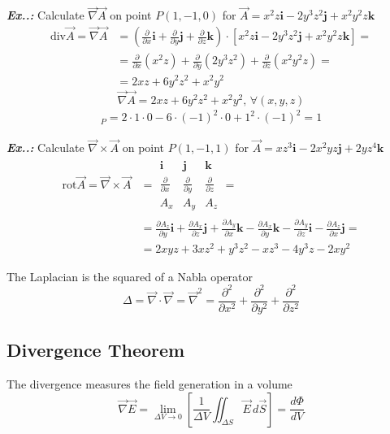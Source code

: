 \documentclass[a4paper]{article}
\begin{document}
\vspace{2ex}\textbf{\textit{Ex.\thesection.\theex: }}Calculate $\vec{\nabla}\vec{A}$ on point $P(1,-1,0)$ for $\vec{A}=x^{2}z\mathbf{i}-2y^{3}z^{2}\mathbf{j}+x^{2}y^{2}z\mathbf{k}$
\begin{align}
\text{div}\vec{A}=\vec{\nabla}\vec{A}&=\left(\frac{\partial}{\partial x}\mathbf{i}+\frac{\partial}{\partial y}\mathbf{j}+\frac{\partial}{\partial z}\mathbf{k}\right)\cdot [x^{2}z\mathbf{i}-2y^{3}z^{2}\mathbf{j}+x^{2}y^{2}z\mathbf{k}]= \\
&=\frac{\partial}{\partial x}(x^{2}z)+\frac{\partial}{\partial y}(2y^{3}z^{2})+\frac{\partial}{\partial z}(x^{2}y^{2}z)= \\
&=2xz+6y^{2}z^{2}+x^{2}y^{2}
\end{align}
$$
\Vec{\nabla}\Vec{A}=2xz+6y^{2}z^{2}+x^{2}y^{2},\,\forall(x,y,z)
$$
\begin{align}
[\vec{\nabla}\vec{A}]_{P}=2\cdot 1\cdot 0-6\cdot (-1)^{2}\cdot 0+1^{2}\cdot (-1)^{2}=\boxed{1}
\end{align}

\vspace{2ex}\textbf{\textit{Ex.\thesection.\theex: }}Calculate $\vec{\nabla}\times \vec{A}$ on point $P(1,-1,1)$ for $\vec{A}=xz^{3}\mathbf{i}-2x^{2}yz\mathbf{j}+2yz^{4}\mathbf{k}$
\begin{align}
\text{rot}\vec{A}=\vec{\nabla}\times \vec{A}&=\begin{array}{|ccc|}
\mathbf{i} & \mathbf{j} & \mathbf{k} \\
\frac{\partial}{\partial x} & \frac{\partial}{\partial y} & \frac{\partial}{\partial z} \\
A_{x} & A_{y} & A_{z}
\end{array}= \\
&=\frac{\partial A_{z}}{\partial y}\mathbf{i}+\frac{\partial A_{x}}{\partial z}\mathbf{j}+\frac{\partial A_{y}}{\partial x}\mathbf{k}-\frac{\partial A_{x}}{\partial y}\mathbf{k}-\frac{\partial A_{y}}{\partial z}\mathbf{i}-\frac{\partial A_{z}}{\partial x}\mathbf{j}= \\
&=2xyz+3xz^2+y^3z^2-xz^3-4y^3z-2xy^2
\end{align}

The Laplacian is the squared of a Nabla operator
$$
\Delta=\vec{\nabla}\cdot \vec{\nabla}=\vec{\nabla}^{2}=\frac{\partial^{2}}{\partial x^{2}}+\frac{\partial^{2}}{\partial y^{2}}+\frac{\partial^{2}}{\partial z^{2}}
$$

\setcounter{equation}{0}
\subsection{Divergence Theorem}
\setcounter{equation}{0}
The divergence measures the field generation in a volume
$$
\vec{\nabla}\vec{E}=\lim_{ \Delta V \to 0 } \left[ \frac{1}{\Delta V}\iint_{\Delta S}\vec{E}\,d\vec{S} \right]=\frac{d\Phi}{dV}
$$
\end{document}
